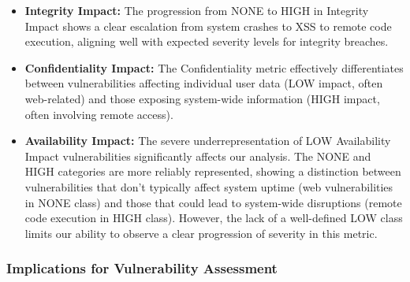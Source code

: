\documentclass[12pt]{article}
\begin{document}
\begin{itemize}

	\item \textbf{Integrity Impact:} The progression from NONE to HIGH in Integrity Impact shows a
	      clear escalation from system crashes to XSS to remote code execution, aligning well with
	      expected severity levels for integrity breaches.

	\item \textbf{Confidentiality Impact:} The Confidentiality metric effectively differentiates
	      between vulnerabilities affecting individual user data (LOW impact, often web-related) and
	      those exposing system-wide information (HIGH impact, often involving remote access).

	\item \textbf{Availability Impact:} The severe underrepresentation of LOW Availability Impact
	      vulnerabilities significantly affects our analysis. The NONE and HIGH categories are more
	      reliably represented, showing a distinction between vulnerabilities that don't typically
	      affect system uptime (web vulnerabilities in NONE class) and those that could lead to
	      system-wide disruptions (remote code execution in HIGH class). However, the lack of a
	      well-defined LOW class limits our ability to observe a clear progression of severity in
	      this metric.

\end{itemize}

\subsubsection{Implications for Vulnerability Assessment}
\end{document}
